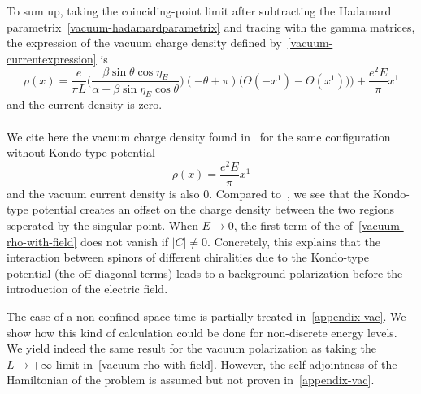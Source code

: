 To sum up,
taking the coinciding-point limit after subtracting the Hadamard parametrix~\cref{vacuum-hadamardparametrix} and tracing with the gamma matrices, 
the expression of the vacuum charge density defined by~\cref{vacuum-currentexpression} is
\begin{equation}\label{vacuum-rho-with-field}
\rho(x) = \frac{e}{\pi L}\Big( \frac{\beta \sin \theta \cos \eta_E}{\alpha + \beta \sin \eta_E \cos \theta}\Big) (-\theta + \pi)
\Big(\Theta(- x^1) - \Theta(x^1))\Big) + \frac{e^2 E}{\pi} x^1
\end{equation}
and the current density is zero. \\\\
%
We cite here the vacuum charge density found in~\cite{Zahn2015} for the same configuration without Kondo-type potential
\begin{equation*}
\rho(x) = \frac{e^2 E}{\pi}x^1
\end{equation*}
and the vacuum current density is also 0.
Compared to~\cite{Zahn2015}, 
we see that the Kondo-type potential creates an offset on the charge density between the two regions seperated by the singular point.
When $E\rightarrow 0$, the first term of the \lhs of~\cref{vacuum-rho-with-field} does not vanish if $|C| \neq 0$.
Concretely, this explains that the interaction between spinors of different chiralities due to the Kondo-type potential (the off-diagonal terms) leads to a background polarization before the introduction of the electric field.
\begin{remark}
The case of a non-confined space-time is partially treated in~\cref{appendix-vac}. 
We show how this kind of calculation could be done for non-discrete energy levels. 
We yield indeed the same result for the vacuum polarization as taking the $L\rightarrow+\infty$ limit in~\cref{vacuum-rho-with-field}. 
However, the self-adjointness of the Hamiltonian of the problem is assumed but not proven in~\cref{appendix-vac}.
\end{remark}

